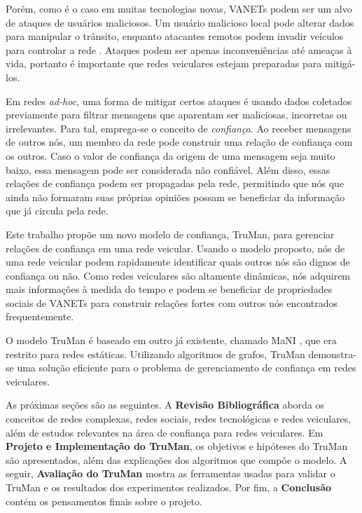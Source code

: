 \begin{resumoextendido}
	Porém, como é o caso em muitas tecnologias novas, VANETs podem ser um alvo de ataques de usuários maliciosos.
	Um usuário malicioso local pode alterar dados para manipular o trânsito, enquanto atacantes remotos podem invadir veículos para controlar a rede \citep{garip2015congestion}.
	Ataques podem ser apenas inconveniências até ameaças à vida, portanto é importante que redes veiculares estejam preparadas para mitigá-los.

	Em redes \textit{ad-hoc}, uma forma de mitigar certos ataques é usando dados coletados previamente para filtrar mensagens que aparentam ser maliciosas, incorretas ou irrelevantes.
	Para tal, emprega-se o conceito de \textit{confiança}.
	Ao receber mensagens de outros nós, um membro da rede pode construir uma relação de confiança com os outros.	
	Caso o valor de confiança da origem de uma mensagem seja muito baixo, essa mensagem pode ser considerada não confiável.
	Além disso, essas relações de confiança podem ser propagadas pela rede, permitindo que nós que ainda não formaram suas próprias opiniões possam se beneficiar da informação que já circula pela rede.

	Este trabalho propõe um novo modelo de confiança, TruMan, para gerenciar relações de confiança em uma rede veicular.
	Usando o modelo proposto, nós de uma rede veicular podem rapidamente identificar quais outros nós são dignos de confiança ou não.
	Como redes veiculares são altamente dinâmicas, nós adquirem mais informações à medida do tempo e podem se beneficiar de propriedades sociais de VANETs para construir relações fortes com outros nós encontrados frequentemente.
	
	O modelo TruMan é baseado em outro já existente, chamado MaNI \citep{vernize2015malicious}, que era restrito para redes estáticas.
	Utilizando algoritmos de grafos, TruMan demonstra-se uma solução eficiente para o problema de gerenciamento de confiança em redes veiculares.
	
	As próximas seções são as seguintes.
	A \textbf{Revisão Bibliográfica} aborda os conceitos de redes complexas, redes sociais, redes tecnológicas e redes veiculares, além de estudos relevantes na área de confiança para redes veiculares.
	Em \textbf{Projeto e Implementação do TruMan}, os objetivos e hipóteses do TruMan são apresentados, além das explicações dos algoritmos que compõe o modelo.
	A seguir, \textbf{Avaliação do TruMan} mostra as ferramentas usadas para validar o TruMan e os resultados dos experimentos realizados.
	Por fim, a \textbf{Conclusão} contém os pensamentos finais sobre o projeto.
		

\end{resumoextendido}
